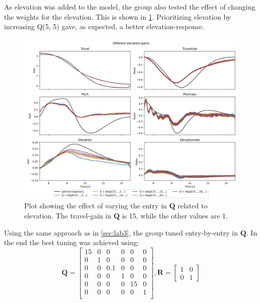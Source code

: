 \documentclass[../main.tex]{subfiles}
\begin{document}
As elevation was added to the model, the group also tested the effect of changing the weights for the elevation. This is shown in \cref{fig:lab4_diff_elevation_values}. Prioritizing elevation by increasing Q(5, 5) gave, as expected, a better elevation-response.
\begin{figure}[h]
	\centering
	\includegraphics[width=\linewidth]{figures/LAB4_elevation_gains.png}
	\caption{Plot showing the effect of varying the entry in $ \bm Q $ related to elevation. The travel-gain in $ \bm Q $ is 15, while the other values are 1.}
	\label{fig:lab4_diff_elevation_values}
\end{figure}

Using the same approach as in \cref{sec:lab3}, the group tuned entry-by-entry in $ \bm Q $. In the end the best tuning was achieved using: 
\begin{equation}\label{key}
	\bm Q = \begin{bmatrix}
		15 & 0 & 0 & 0 & 0 & 0	\\
		0 & 1 & 0 & 0 & 0 	& 0\\
		0 & 0 & 0.1 & 0 & 0& 0 \\
		0 & 0 & 0 & 1 & 0 & 0	\\
		0 & 0 & 0 & 0 & 15 	& 0\\
		0 & 0 & 0 & 0 & 0 	& 1\\
	\end{bmatrix}, 
	\bm R = \begin{bmatrix}
		1 & 0 \\ 
		0 & 1
	\end{bmatrix}
\end{equation}
\end{document}
